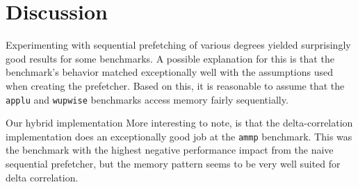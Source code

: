 \section{Discussion}
\label{sec:discussion}

Experimenting with sequential prefetching of various degrees yielded surprisingly good results for some benchmarks.
A possible explanation for this is that the benchmark's behavior matched exceptionally well with the assumptions used when creating the prefetcher.
Based on this, it is reasonable to assume that the \texttt{applu} and \texttt{wupwise} benchmarks access memory fairly sequentially.


Our hybrid implementation 
More interesting to note, is that the delta-correlation implementation does an exceptionally good job at the \texttt{ammp} benchmark.
This was the benchmark with the highest negative performance impact from the naive sequential prefetcher, but the memory pattern seems to be very well suited for delta correlation.
